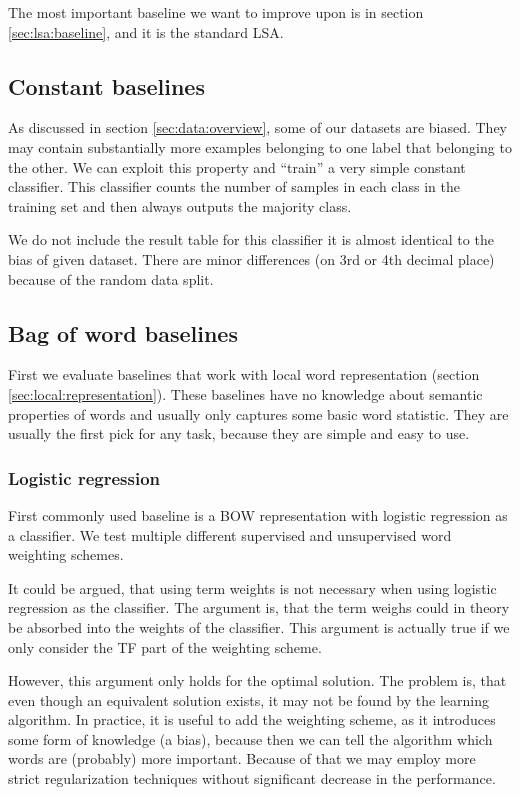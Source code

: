     The most important baseline we want to improve upon is in section \ref{sec:lsa:baseline}, 
    and it is the standard LSA.

    \subsection{Constant baselines}
    
    As discussed in section \ref{sec:data:overview}, some of our datasets are biased. 
    They may contain substantially more examples belonging to one label that belonging to the other.
    We can exploit this property and ``train'' a very simple constant classifier. 
    This classifier counts the number of samples in each class in the training set and then always outputs the majority class.
    
    We do not include the result table for this classifier it is almost identical to the bias of given dataset.
    There are minor differences (on 3rd or 4th decimal place) because of the random data split. 

    \subsection{Bag of word baselines}
    
    First we evaluate baselines that work with local word representation (section \ref{sec:local:representation}).
    These baselines have no knowledge about semantic properties of words and usually only captures some basic word statistic.
    They are usually the first pick for any task, because they are simple and easy to use. 
    
    \subsubsection{Logistic regression}
    
    First commonly used baseline is a BOW representation with logistic regression as a classifier. 
    We test multiple different supervised and unsupervised word weighting schemes.
    
    It could be argued, that using term weights is not necessary when using logistic regression as the classifier.
    The argument is, that the term weighs could in theory be absorbed into the weights of the classifier. 
    This argument is actually true if we only consider the TF part of the weighting scheme.
    
    However, this argument only holds for the optimal solution. 
    The problem is, that even though an equivalent solution exists, it may not be found by the learning algorithm. 
    In practice, it is useful to add the weighting scheme, 
    as it introduces some form of knowledge (a bias), 
    because then we can tell the algorithm which words are (probably) more important.
    Because of that we may employ more strict regularization techniques without significant decrease in the performance.
    


